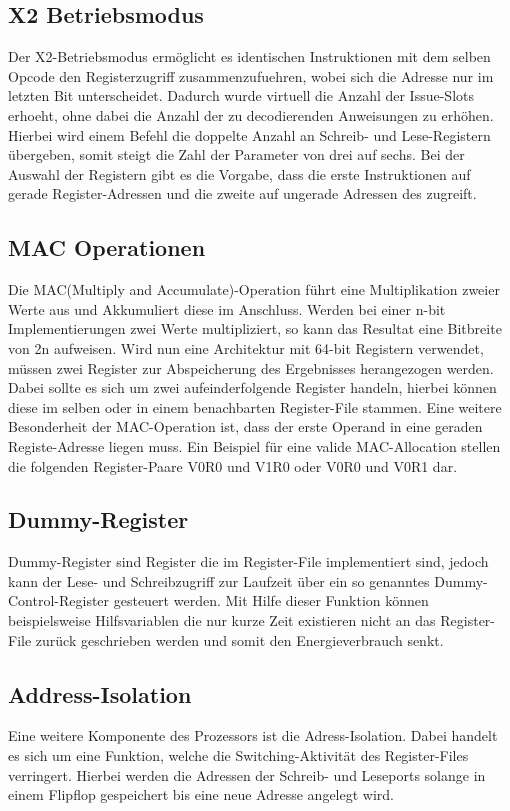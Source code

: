 \subsection{X2 Betriebsmodus}\label{subsec:x2Mode}
Der X2-Betriebsmodus ermöglicht es identischen Instruktionen mit dem selben Opcode den Registerzugriff zusammenzufuehren, wobei sich die Adresse nur im letzten Bit unterscheidet. Dadurch wurde virtuell die Anzahl der Issue-Slots erhoeht, ohne dabei die Anzahl der zu decodierenden Anweisungen zu erhöhen. Hierbei wird einem Befehl die doppelte Anzahl an Schreib- und Lese-Registern übergeben, somit steigt die Zahl der Parameter von drei auf sechs. Bei der Auswahl der Registern gibt es die Vorgabe, dass die erste Instruktionen auf gerade Register-Adressen und die zweite auf ungerade Adressen des zugreift. \cite{paya2009instruction}
\subsection{MAC Operationen}\label{subsec:macMode}
Die MAC(Multiply and Accumulate)-Operation führt eine Multiplikation zweier Werte aus und Akkumuliert diese im Anschluss. Werden bei einer n-bit Implementierungen zwei Werte multipliziert, so kann das Resultat eine Bitbreite von 2n aufweisen. Wird nun eine Architektur mit 64-bit Registern verwendet, müssen zwei Register zur Abspeicherung des Ergebnisses herangezogen werden. Dabei sollte es sich um zwei aufeinderfolgende Register handeln, hierbei können diese im selben oder in einem benachbarten Register-File stammen. Eine weitere Besonderheit der MAC-Operation ist, dass der erste Operand in eine geraden Registe-Adresse liegen muss. Ein Beispiel für eine valide MAC-Allocation stellen die folgenden Register-Paare V0R0 und V1R0 oder V0R0 und V0R1 dar.
  

\subsection{Dummy-Register}\label{subsec:dummy}
Dummy-Register sind Register die im Register-File implementiert sind, jedoch kann der Lese- und Schreibzugriff zur Laufzeit über ein so genanntes Dummy-Control-Register gesteuert werden. Mit Hilfe dieser Funktion können beispielsweise Hilfsvariablen die nur kurze Zeit existieren nicht an das Register-File zurück geschrieben werden und somit den Energieverbrauch senkt. 

\subsection{Address-Isolation}\label{subsec:add_iso}
Eine weitere Komponente des Prozessors ist die Adress-Isolation. Dabei handelt es sich um eine Funktion, welche die Switching-Aktivität des Register-Files verringert. Hierbei werden die Adressen der Schreib- und Leseports solange in einem Flipflop gespeichert bis eine neue Adresse angelegt wird.\cite{lukasglitches2017}

